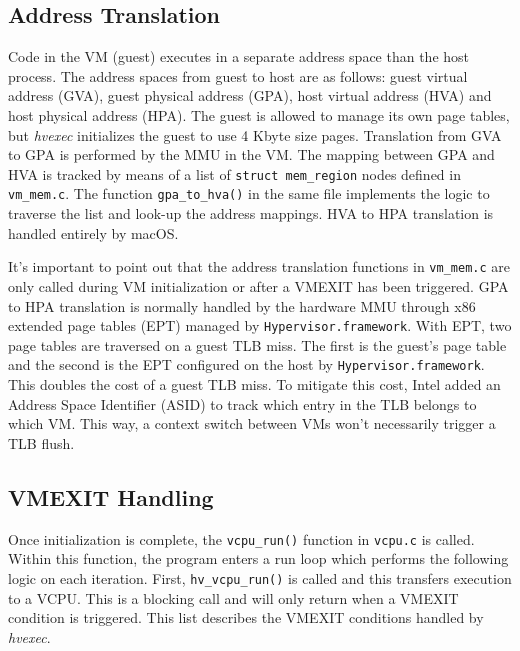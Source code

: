 \documentclass{article}
\newcommand{\PROJNAME}{\textit{hvexec}}
\begin{document}
\subsection{Address Translation}
Code in the VM (guest) executes in a separate address space than the host process.
The address spaces from guest to host are as follows: guest virtual address (GVA), guest physical address (GPA), host virtual address (HVA) and host physical address (HPA).
The guest is allowed to manage its own page tables, but \PROJNAME{} initializes the guest to use 4 Kbyte size pages.
Translation from GVA to GPA is performed by the MMU in the VM.
The mapping between GPA and HVA is tracked by means of a list of \texttt{struct mem\_region} nodes defined in \texttt{vm\_mem.c}. The function \texttt{gpa\_to\_hva()} in the same file implements the logic to traverse the list and look-up the address mappings. 
HVA to HPA translation is handled entirely by macOS.

It's important to point out that the address translation functions in \texttt{vm\_mem.c} are only called during VM initialization or after a VMEXIT has been triggered.
GPA to HPA translation is normally handled by the hardware MMU through x86 extended page tables (EPT) managed by \texttt{Hypervisor.framework}.
With EPT, two page tables are traversed on a guest TLB miss. The first is the guest's page table and the second is the EPT configured on the host by \texttt{Hypervisor.framework}.
This doubles the cost of a guest TLB miss.
To mitigate this cost, Intel added an Address Space Identifier (ASID) to
track which entry in the TLB belongs to which VM. This way, a context switch between VMs won't necessarily trigger a TLB flush.

\subsection{VMEXIT Handling}
Once initialization is complete, the \texttt{vcpu\_run()} function in \texttt{vcpu.c} is called.
Within this function, the program enters a run loop which performs the following logic on each iteration. 
First, \texttt{hv\_vcpu\_run()} is called and this transfers execution to a VCPU.
This is a blocking call and will only return when a VMEXIT condition is triggered.
This list describes the VMEXIT conditions handled by \PROJNAME{}.
\end{document}

